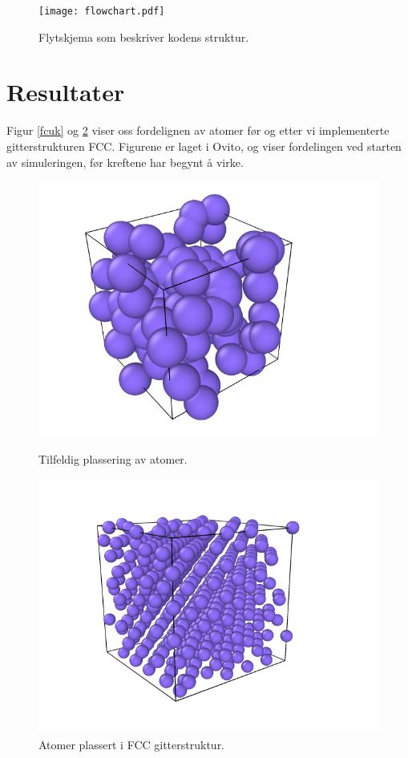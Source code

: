 \documentclass[paper=a4, fontsize=11pt]{scrartcl} %
\numberwithin{equation}{section} %
\numberwithin{figure}{section} %
\numberwithin{table}{section} %
\begin{document}
\FloatBarrier
\begin{figure}[!ht]
 \centering
 \texttt{[image: flowchart.pdf]}
 \caption{Flytskjema som beskriver kodens struktur.}
 \label{flow}
 \end{figure}
 \FloatBarrier


\section{Resultater}
Figur \ref{fcuk} og \ref{fcuk2} viser oss fordelignen av atomer før og etter vi implementerte gitterstrukturen FCC. Figurene er laget i Ovito, og viser fordelingen ved starten av simuleringen, før kreftene har begynt å virke. 

 \FloatBarrier
\begin{figure}[!htb]
  \includegraphics[width=\linewidth]{5cnoFCC.png}
  \caption{Tilfeldig plassering av atomer.}\label{fcuk}
\endminipage\hfill
{}
  \includegraphics[width=\linewidth]{5cFCC.png}
  \caption{Atomer plassert i FCC gitterstruktur.}\label{fcuk2}
\endminipage\hfill
\end{figure}
 \FloatBarrier
 
\end{document}
